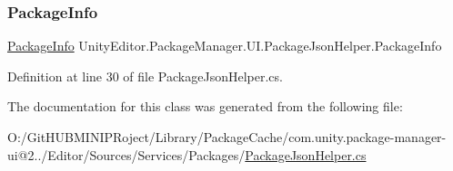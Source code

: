 \subsubsection{\texorpdfstring{PackageInfo}{PackageInfo}}
{\footnotesize\ttfamily \mbox{\hyperlink{class_unity_editor_1_1_package_manager_1_1_u_i_1_1_package_info}{Package\+Info}} Unity\+Editor.\+Package\+Manager.\+U\+I.\+Package\+Json\+Helper.\+Package\+Info\hspace{0.3cm}{\ttfamily [get]}}



Definition at line 30 of file Package\+Json\+Helper.\+cs.



The documentation for this class was generated from the following file\+:\begin{DoxyCompactItemize}
\item 
O\+:/\+Git\+H\+U\+B\+M\+I\+N\+I\+P\+Roject/\+Library/\+Package\+Cache/com.\+unity.\+package-\/manager-\/ui@2../\+Editor/\+Sources/\+Services/\+Packages/\mbox{\hyperlink{_package_json_helper_8cs}{Package\+Json\+Helper.\+cs}}\end{DoxyCompactItemize}
